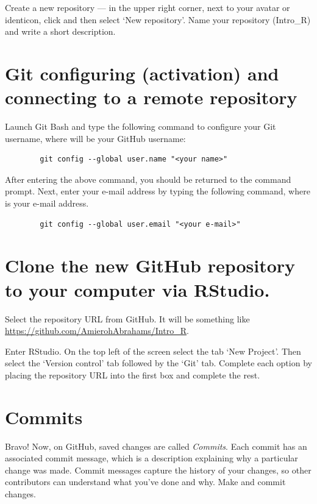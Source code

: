 \documentclass[
]{book}
\begin{document}
Create a new repository --- in the upper right corner, next to your avatar or identicon, click and then select `New repository'. Name your repository (Intro\_R) and write a short description.

\hypertarget{git-configuring-activation-and-connecting-to-a-remote-repository}{%
\section{Git configuring (activation) and connecting to a remote repository}\label{git-configuring-activation-and-connecting-to-a-remote-repository}}

Launch Git Bash and type the following command to configure your Git username, where will be your GitHub username:

\begin{verbatim}
        git config --global user.name "<your name>"
\end{verbatim}

After entering the above command, you should be returned to the command prompt. Next, enter your e-mail address by typing the following command, where is your e-mail address.

\begin{verbatim}
        git config --global user.email "<your e-mail>"
\end{verbatim}

\hypertarget{clone-the-new-github-repository-to-your-computer-via-rstudio.}{%
\section{Clone the new GitHub repository to your computer via RStudio.}\label{clone-the-new-github-repository-to-your-computer-via-rstudio.}}

Select the repository URL from GitHub. It will be something like \url{https://github.com/AmierohAbrahams/Intro_R}.

Enter RStudio. On the top left of the screen select the tab `New Project'. Then select the `Version control' tab followed by the `Git' tab. Complete each option by placing the repository URL into the first box and complete the rest.

\hypertarget{commits}{%
\section{Commits}\label{commits}}

Bravo! Now, on GitHub, saved changes are called \emph{Commits}. Each commit has an associated commit message, which is a description explaining why a particular change was made. Commit messages capture the history of your changes, so other contributors can understand what you've done and why.
Make and commit changes.
\end{document}
